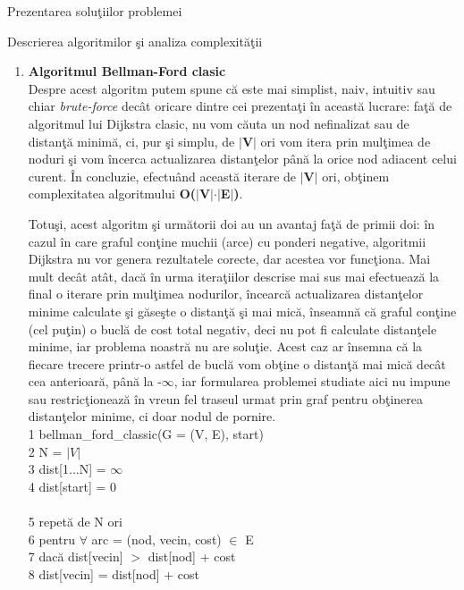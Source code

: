 \documentclass[a4paper]{article}
\begin{document}
\begin{section}{Prezentarea solu\c tiilor problemei\\}
\begin{subsection}{Descrierea algoritmilor \c si analiza complexit\u a\c tii\\}
\begin{enumerate}
	\item \textbf{Algoritmul Bellman-Ford clasic\cite{bford}} \\[0.4cm]
	Despre acest algoritm putem spune c\u a este mai simplist, naiv, intuitiv sau chiar \textit{brute-force} dec\^ at oricare dintre cei prezenta\c ti \^ in aceast\u a lucrare: fa\c t\u a de algoritmul lui Dijkstra clasic, nu vom c\u auta un nod nefinalizat sau de distan\c t\u a minim\u a, ci, pur \c si simplu, de \textbf{$|$V$|$} ori vom itera prin mul\c timea de noduri \c si vom \^ incerca actualizarea distan\c telor p\^ an\u a la orice nod adiacent celui curent. 
\^ In concluzie, efectu\^ and aceast\u a iterare de \textbf{$|$V$|$} ori, ob\c tinem complexitatea algoritmului \textbf{O($|$V$|$$\cdot$$|$E$|$)}.
	
	Totu\c si, acest algoritm \c si urm\u atorii doi au un avantaj fa\c t\u a de primii doi: \^ in cazul \^ in care graful con\c tine muchii (arce) cu ponderi negative, algoritmii Dijkstra nu vor genera rezultatele corecte, dar acestea vor func\c tiona. Mai mult dec\^ at at\^ at, dac\u a \^ in urma itera\c tiilor descrise mai sus mai efectueaz\u a la final o iterare prin mul\c timea nodurilor, \^ incearc\u a actualizarea distan\c telor minime calculate \c si g\u ase\c ste o distan\c t\u a \c si mai mic\u a, \^ inseamn\u a c\u a graful con\c tine (cel pu\c tin) o bucl\u a de cost total negativ, deci nu pot fi calculate distan\c tele minime, iar problema noastr\u a nu are solu\c tie. Acest caz ar \^ insemna c\u a la fiecare trecere printr-o astfel de bucl\u a vom ob\c tine o distan\c t\u a mai mic\u a dec\^ at cea anterioar\u a, p\^ an\u a la -$\infty$, iar formularea problemei studiate aici nu impune sau restric\c tioneaz\u a \^ in vreun fel traseul urmat prin graf pentru ob\c tinerea distan\c telor minime, ci doar nodul de pornire. \\

	1 \quad bellman\_ford\_classic(G = (V, E), start) \\
	2 \quad\quad\quad N = $|V|$ \\
	3 \quad\quad\quad dist[1...N] = $\infty$ \\
	4 \quad\quad\quad dist[start] = 0 \\ \\
	5 \quad\quad\quad repet\u a de N ori \\
	6  \quad\quad\quad\quad\quad pentru $\forall$ arc = (nod, vecin, cost) $\in$ E \\
	7 \quad\quad\quad\quad\quad\quad\quad dac\u a dist[vecin] $>$ dist[nod] + cost \\
	8 \quad\quad\quad\quad\quad\quad\quad\quad\quad  dist[vecin] = dist[nod] + cost \\ \\


\end{enumerate}
\end{subsection}
\end{section}
\end{document}
